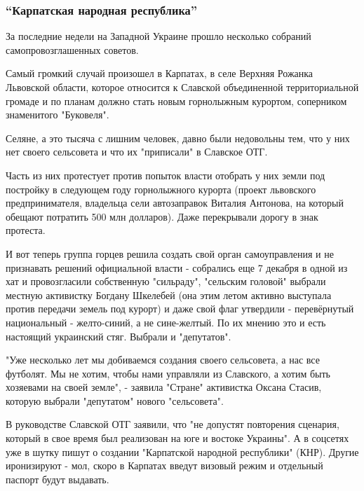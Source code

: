  
 
 
 
 
\subsubsection{\enquote{Карпатская народная республика}}

За последние недели на Западной Украине прошло несколько собраний
самопровозглашенных советов. 

Самый громкий случай произошел в Карпатах, в селе Верхняя Рожанка
Львовской области, которое относится к Славской объединенной
территориальной громаде и по планам должно стать новым горнолыжным
курортом, соперником знаменитого "Буковеля".

Селяне, а это тысяча с лишним человек, давно были недовольны тем, что у
них нет своего сельсовета и что их "приписали" в Славское ОТГ.

Часть из них протестует против попыток власти отобрать у них земли под
постройку в следующем году горнолыжного курорта (проект львовского
предпринимателя, владельца сели автозаправок Виталия Антонова, на который
обещают потратить 500 млн долларов). Даже перекрывали дорогу в знак
протеста.

И вот теперь группа горцев решила создать свой орган самоуправления и не
признавать решений официальной власти - собрались еще 7 декабря в одной из
хат и провозгласили собственную "сильраду", "сельским головой" выбрали
местную активистку Богдану Шкелебей (она этим летом активно выступала
против передачи земель под курорт) и даже свой флаг утвердили -
перевёрнутый национальный - желто-синий, а не сине-желтый. По их мнению
это и есть настоящий украинский стяг. Выбрали и "депутатов".

"Уже несколько лет мы добиваемся создания своего сельсовета, а нас все
футболят. Мы не хотим, чтобы нами управляли из Славского, а хотим быть
хозяевами на своей земле", - заявила "Стране" активистка Оксана Стасив,
которую выбрали "депутатом" нового "сельсовета".    

В руководстве Славской ОТГ заявили, что "не допустят повторения сценария,
который в свое время был реализован на юге и востоке Украины". А в
соцсетях уже в шутку пишут о создании "Карпатской народной республики"
(КНР). Другие иронизируют - мол, скоро в Карпатах введут визовый режим и
отдельный паспорт будут выдавать.

